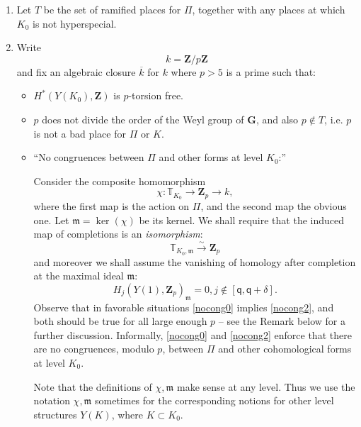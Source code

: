 \documentclass[10pt]{amsart}
\newcommand{\Z}{\mathbf{Z}}
\theoremstyle{remark}
\newcommand{\BWq}{\mathsf{q}}
\newcommand{\GG}{\mathbf{G}}
\begin{document}
\begin{enumerate}
   
\index{$\Pi$}  
 
 \item 
Let $T$ be the set of ramified places for $\Pi$, together with
any places at which $K_0$ is not hyperspecial.   

 
 
 \item 
 Write
 $$k =\Z/p\Z$$ and fix an algebraic closure $\overline{k}$ for $k$
 where  $p > 5$ is a prime such that:
  
 \begin{itemize}
 \item[(a)]  $H^*(Y(K_0), \Z)$ is $p$-torsion free.\item[(b)] $p$ does not 
divide the order of the Weyl group of $\GG$, and also $p \notin T$, i.e. $p$ is not a bad 
place for $\Pi$ or $K$. 

      \item[(c)]  
``No congruences between $\Pi$ and other forms at level $K_0$:''

Consider the composite homomorphism
\begin{equation} \label{chi_def}  \chi: \mathbb{T}_{K_0} \rightarrow \Z_p \rightarrow k,\end{equation}
where the first map is the action on $\Pi$, and the second map the obvious one.
Let $\mathfrak{m} = \ker(\chi) $ be its kernel.   
We  shall require that  the induced map of completions is an {\em isomorphism}:  
\begin{equation} \label{nocong0} \mathbb{T}_{K_0, \mathfrak{m}} \stackrel{\sim}{\longrightarrow} \Z_p\end{equation}
and moreover we shall assume the vanishing of   homology after completion at the maximal ideal $\mathfrak{m}$:
 \begin{equation} \label{nocong2} H_j(Y(1), \Z_p)_{\mathfrak{m}} =  0,   j  \notin  [\BWq, \BWq+\delta].  \end{equation} 
 Observe that in favorable situations \eqref{nocong0} implies \eqref{nocong2}, and both should be true for all large enough $p$ -- 
  see the Remark below
for a further discussion.    Informally, \eqref{nocong0} and \eqref{nocong2} enforce
that there are no congruences, modulo $p$, between $\Pi$ and other cohomological forms at level $K_0$. 

Note that the definitions of $\chi, \mathfrak{m}$ make sense at any level.  Thus we use the notation $\chi, \mathfrak{m}$ sometimes for the corresponding notions for other level structures $Y(K)$,
where $K \subset K_0$. 
  

\end{itemize}
\end{enumerate}
\end{document}
